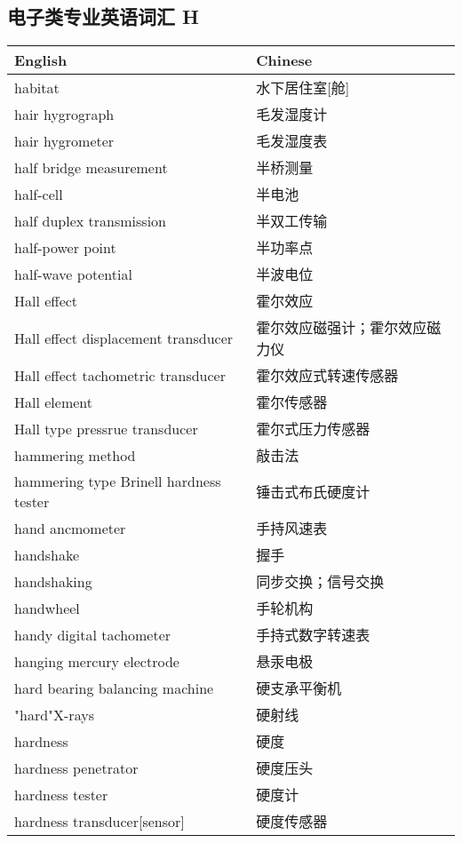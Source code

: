 \documentclass[
]{article}
\begin{document}
\hypertarget{ux7535ux5b50ux7c7bux4e13ux4e1aux82f1ux8bedux8bcdux6c47-h}{%
\subsection{\texorpdfstring{电子类专业英语词汇 H
}{电子类专业英语词汇 H }}\label{ux7535ux5b50ux7c7bux4e13ux4e1aux82f1ux8bedux8bcdux6c47-h}}

\begin{longtable}[]{@{}ll@{}}
\toprule()
English & Chinese \\
\midrule()
\endhead
habitat & 水下居住室{[}舱{]} \\
hair hygrograph & 毛发湿度计 \\
hair hygrometer & 毛发湿度表 \\
half bridge measurement & 半桥测量 \\
half-cell & 半电池 \\
half duplex transmission & 半双工传输 \\
half-power point & 半功率点 \\
half-wave potential & 半波电位 \\
Hall effect & 霍尔效应 \\
Hall effect displacement transducer & 霍尔效应磁强计；霍尔效应磁力仪 \\
Hall effect tachometric transducer & 霍尔效应式转速传感器 \\
Hall element & 霍尔传感器 \\
Hall type pressrue transducer & 霍尔式压力传感器 \\
hammering method & 敲击法 \\
hammering type Brinell hardness tester & 锤击式布氏硬度计 \\
hand ancmometer & 手持风速表 \\
handshake & 握手 \\
handshaking & 同步交换；信号交换 \\
handwheel & 手轮机构 \\
handy digital tachometer & 手持式数字转速表 \\
hanging mercury electrode & 悬汞电极 \\
hard bearing balancing machine & 硬支承平衡机 \\
"hard"X-rays & 硬射线 \\
hardness & 硬度 \\
hardness penetrator & 硬度压头 \\
hardness tester & 硬度计 \\
hardness transducer{[}sensor{]} & 硬度传感器 \\

\end{longtable}
\end{document}
